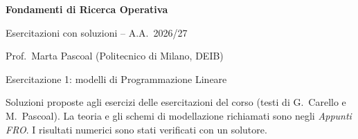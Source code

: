 \documentclass[11pt,a4paper,openany]{report}
\begin{document}
\begin{titlepage}
\centering
\vspace*{3cm}
{\Huge\bfseries Fondamenti di Ricerca Operativa\par}
\vspace{0.6cm}
{\Large Esercitazioni con soluzioni -- A.A.\ 2026/27\par}
\vspace{0.4cm}
{\large Prof.\ Marta Pascoal (Politecnico di Milano, DEIB)\par}
\vspace{1.5cm}
{\large Esercitazione 1: modelli di Programmazione Lineare\par}
\vfill
{\small Soluzioni proposte agli esercizi delle esercitazioni del corso (testi di G.\ Carello e M.\ Pascoal). La teoria e gli schemi di modellazione richiamati sono negli \emph{Appunti FRO}. I risultati numerici sono stati verificati con un solutore.\par}
\end{titlepage}

\tableofcontents


\end{document}
